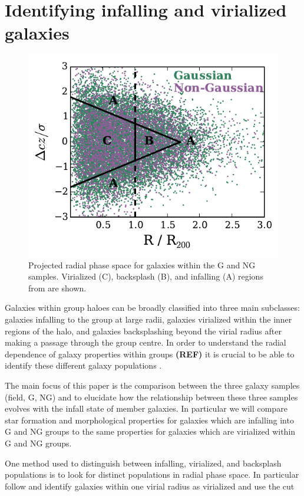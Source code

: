 \documentclass[a4paper,fleqn,usenatbib]{mnras}
\begin{document}

\section{Identifying infalling and virialized galaxies}
\label{sec:rad_div}

\begin{figure}
  \centering
  \includegraphics[width=\columnwidth]{vnorm_r.pdf}
  \caption{Projected radial phase space
    for galaxies within the G and NG samples.  Virialized (C),
    backsplash (B), and infalling (A) regions from
    \citet{mahajan2011} are shown.}
  \label{fig:vnorm_r}
\end{figure}

Galaxies within group haloes can be broadly classified into three main
subclasses: galaxies infalling to the group at large radii, galaxies
virialized within the inner regions of the halo, and galaxies
backsplashing beyond the virial radius after making a passage through
the group centre.  In order to understand the radial dependence of
galaxy properties within groups \textbf{(REF)} it is crucial to be able to
identify these different galaxy populations
\citep{gill2005, mahajan2011, pimbblet2011}.
\par
The main focus of this paper is the comparison between the three
galaxy samples (field, G, NG) and to elucidate how the relationship
between these three samples evolves with the infall state of member
galaxies.  In particular we will compare star formation and
morphological properties for galaxies which are infalling into G and
NG groups to the same properties for galaxies which are virialized
within G and NG groups.
\par
One method used to distinguish between infalling, virialized, and
backsplash populations is to look for distinct populations in radial
phase space.  In particular \citet{mahajan2011} follow
\citet{sanchis2004} and identify galaxies within one virial radius as
virialized and use the cut
\end{document}
